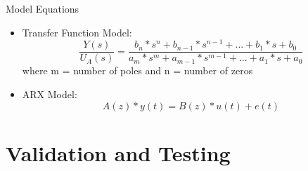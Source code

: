 \documentclass{beamer}
\begin{document}
\begin{frame}{Model Equations}
	\begin{block}{}
		\begin{itemize}
			\item Transfer Function Model: 
			\begin{equation}
				\frac{Y(s)}{U_A(s)} = \frac{b_{n}*s^{n} + b_{n-1}*s^{n-1} + ... + b_1*s + b_0}{a_{m}*s^{m} + a_{m-1}*s^{m-1} + ... + a_1*s + a_0}
			\end{equation}
			where m = number of poles and n = number of zeros
			\item ARX Model: 
			\begin{equation}
				A(z)*y(t) = B(z)*u(t) + e(t)
			\end{equation}
		\end{itemize}
	\end{block}
\end{frame}

\section{Validation and Testing}
\end{document}
